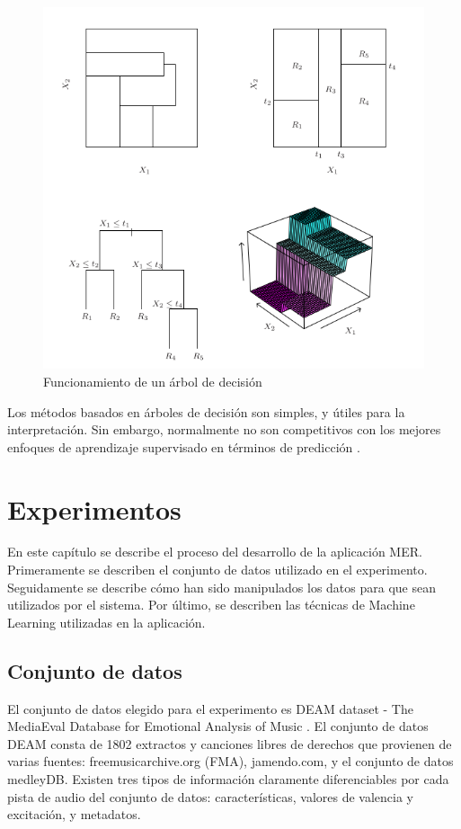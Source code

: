 \documentclass[12pt,a4paper,Spanish]{article}
\begin{document}
\begin{figure}[H]
	\centering
	\includegraphics[width=0.7\linewidth]{figs/decission_tree}
	\caption{Funcionamiento de un árbol de decisión}
	\label{fig:decissiontree}
\end{figure}


Los métodos basados en árboles de decisión son simples, y útiles para la interpretación. Sin embargo, normalmente no son competitivos con los mejores enfoques de aprendizaje supervisado en términos de predicción \cite{gareth2013introduction}.







\newpage
\section{Experimentos}
En este capítulo se describe el proceso del desarrollo de la aplicación MER. Primeramente se describen el conjunto de datos utilizado en el experimento. Seguidamente se describe cómo han sido manipulados los datos para que sean utilizados por el sistema. Por último, se describen las técnicas de Machine Learning utilizadas en la aplicación.


\subsection{Conjunto de datos}
El conjunto de datos elegido para el experimento es DEAM dataset - The MediaEval Database for Emotional Analysis of Music \cite{AlajankiEmoInMusicAnalysis}. El conjunto de datos DEAM consta de 1802 extractos y canciones libres de derechos que provienen de varias fuentes: freemusicarchive.org (FMA), jamendo.com,
y el conjunto de datos medleyDB.
\newline
Existen tres tipos de información claramente diferenciables por cada pista de audio del conjunto de datos: características, valores de valencia y excitación, y metadatos.
\end{document}
